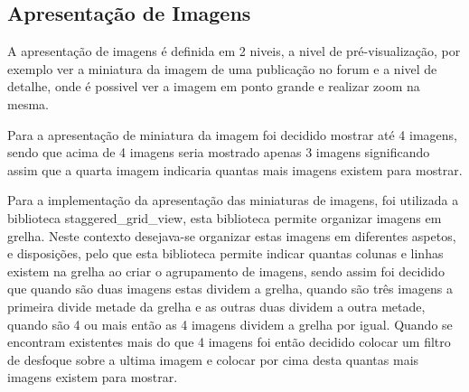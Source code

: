 \subsection{Apresentação de Imagens}
A apresentação de imagens é definida em 2 niveis, a nivel de pré-visualização, por exemplo ver a miniatura da imagem de uma publicação no forum e a nivel de detalhe, onde é possivel ver a imagem em ponto grande e realizar zoom na mesma.

Para a apresentação de miniatura da imagem foi decidido mostrar até 4 imagens, sendo que acima de 4 imagens seria mostrado apenas 3 imagens significando assim que a quarta imagem indicaria quantas mais imagens existem para mostrar. 

Para a implementação da apresentação das miniaturas de imagens, foi utilizada a biblioteca staggered\_grid\_view, esta biblioteca permite organizar imagens em grelha. Neste contexto desejava-se organizar estas imagens em diferentes aspetos, e disposições, pelo que esta biblioteca permite indicar quantas colunas e linhas existem na grelha ao criar o agrupamento de imagens, sendo assim foi decidido que quando são duas imagens estas dividem a grelha, quando são três imagens a primeira divide metade da grelha e as outras duas dividem a outra metade, quando são 4 ou mais então as 4 imagens dividem a grelha por igual. Quando se encontram existentes mais do que 4 imagens foi então decidido colocar um filtro de desfoque sobre a ultima imagem e colocar por cima desta quantas mais imagens existem para mostrar.

